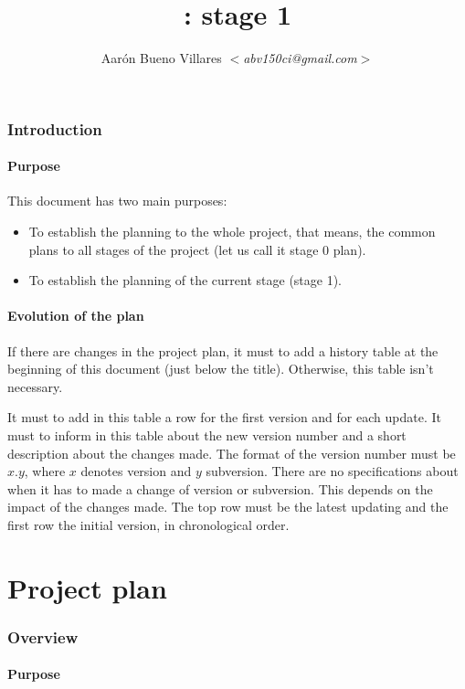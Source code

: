 \documentclass[twocolumn]{article}
\title{\fav: \favp stage 1}
\author{Aarón Bueno Villares \textit{$<$abv150ci@gmail.com$>$}}
\begin{document}
\twocolumn[
  \maketitle
]

\tableofcontents

\section{Introduction}
\subsection{Purpose}
This document has two main purposes:

\begin{itemize}
\item To establish the planning to the whole project, that means, the
  common plans to all stages of the project (let us call it stage 0
  plan).
\item To establish the planning of the current stage (stage 1).
\end{itemize}

\subsection{Evolution of the plan}
If there are changes in the project plan, it must to add a history
table at the beginning of this document (just below the
title). Otherwise, this table isn't necessary.

It must to add in this table a row for the first version and for each
update. It must to inform in this table about the new version number
and a short description about the changes made. The format of the
version number must be $x.y$, where $x$ denotes version and $y$
subversion. There are no specifications about when it has to made a
change of version or subversion. This depends on the impact of the
changes made. The top row must be the latest updating and the first row
the initial version, in chronological order.

\part{Project plan}

\section{Overview}
\subsection{Purpose}
\end{document}
